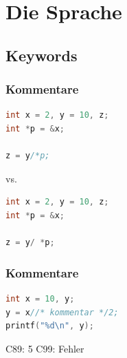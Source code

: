 \documentclass[12pt,compress]{beamer}
\begin{document}
\section{Die Sprache}


\subsection{Keywords}


\begin{frame}[fragile]
\frametitle{Kommentare}

\begin{lstlisting}[language=C,basicstyle=\ttfamily,keywordstyle=\color{red}]
int x = 2, y = 10, z;
int *p = &x; 

z = y/*p;
\end{lstlisting}

vs.

\begin{lstlisting}[language=C,basicstyle=\ttfamily,keywordstyle=\color{red}]
int x = 2, y = 10, z;
int *p = &x; 

z = y/ *p;
\end{lstlisting}
\end{frame}

\begin{frame}[fragile]
\frametitle{Kommentare}

\begin{lstlisting}[language=C,basicstyle=\ttfamily,keywordstyle=\color{red}]
int x = 10, y;
y = x//* kommentar */2;
printf("%d\n", y);
\end{lstlisting}

\vfill

\begin{center}
C89: 5 \quad\quad C99: Fehler
\end{center}

\end{frame}
\end{document}
